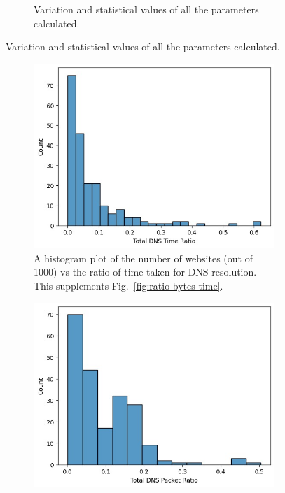 \documentclass{article}
\begin{document}
\begin{figure}[htpb]
\begin{subfigure}[b]{0.48\linewidth}
        \vspace{-7mm}
        \caption{Variation and statistical values of all the parameters calculated.}
        \vspace{-3mm}
        \label{fig:packet-ratio}
    \end{subfigure}
\end{figure}


\begin{figure}[htpb]
    \centering
    \begin{subfigure}[b]{0.48\linewidth}
        \includegraphics[width=\linewidth]{plots/time-ratio.jpeg}
        \vspace{-7mm}
        \caption{A histogram plot of the number of websites (out of 1000) vs the ratio of time taken for DNS resolution. This supplements Fig.~\ref{fig:ratio-bytes-time}.}
        \vspace{-3mm}
        \label{fig:time-ratio}
    \end{subfigure}
    \hfill
    \begin{subfigure}[b]{0.48\linewidth}
        \includegraphics[width=\linewidth]{plots/packet-ratio.jpeg}

\end{subfigure}
\end{figure}
\end{document}
